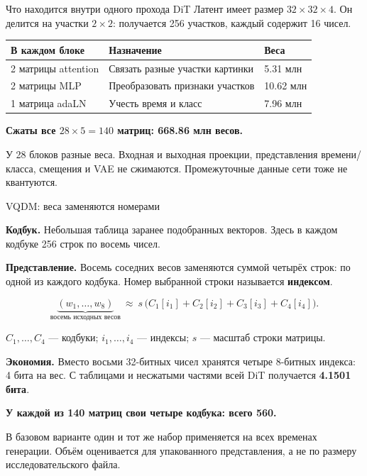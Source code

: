 \documentclass[aspectratio=1610,11pt]{beamer}
\renewcommand{\fact}[2]{\par\textcolor{Accent}{\textbf{#1.}} #2\par}
\newcommand{\finding}[1]{\par\vspace{.5mm}\textbf{#1}\par}
\newcommand{\detail}[1]{{\fontsize{10}{12}\selectfont #1\par}}
\newenvironment{datatable}{\par\begingroup\fontsize{10.5}{12.5}\selectfont\setlength{\tabcolsep}{4pt}\renewcommand{\arraystretch}{1.2}}{\par\endgroup}
\begin{document}
\begin{frame}[t]{Что находится внутри одного прохода DiT}
  Латент имеет размер $32\times32\times4$. Он делится на участки $2\times2$:
  получается 256 участков, каждый содержит 16 чисел.
  \begin{center}
  \end{center}
  \begin{datatable}
    \begin{tabular*}{\textwidth}{@{\extracolsep{\fill}}lll@{}}
      \toprule
      В каждом блоке & Назначение & Веса\\
      \midrule
      2 матрицы attention & Связать разные участки картинки & 5.31 млн\\
      2 матрицы MLP & Преобразовать признаки участков & 10.62 млн\\
      1 матрица adaLN & Учесть время и класс & 7.96 млн\\
      \bottomrule
    \end{tabular*}
  \end{datatable}
  \finding{Сжаты все $28\times5=140$ матриц: 668.86 млн весов.}
  \detail{У 28 блоков разные веса. Входная и выходная проекции, представления времени/класса,
  смещения и VAE не сжимаются. Промежуточные данные сети тоже не квантуются.}
\end{frame}

\begin{frame}[t]{VQDM: веса заменяются номерами}
  \fact{Кодбук}{Небольшая таблица заранее подобранных векторов.
  Здесь в каждом кодбуке 256 строк по восемь чисел.}
  \fact{Представление}{Восемь соседних весов заменяются суммой четырёх строк:
  по одной из каждого кодбука. Номер выбранной строки называется \textbf{индексом}.}
  \[
    \underbrace{(w_1,\ldots,w_8)}_{\text{восемь исходных весов}}
    \ \approx\ s\,\bigl( C_1[i_1]+C_2[i_2]+C_3[i_3]+C_4[i_4]\bigr).
  \]
  \detail{$C_1,\ldots,C_4$ --- кодбуки; $i_1,\ldots,i_4$ --- индексы; $s$ --- масштаб строки матрицы.}
  \fact{Экономия}{Вместо восьми 32-битных чисел хранятся четыре 8-битных индекса:
  4 бита на вес. С таблицами и несжатыми частями всей DiT получается \textbf{4.1501 бита}.}
  \finding{У каждой из 140 матриц свои четыре кодбука: всего 560.}
  \detail{В базовом варианте один и тот же набор применяется на всех временах генерации.
  Объём оценивается для упакованного представления, а не по размеру исследовательского файла.}
\end{frame}
\end{document}
